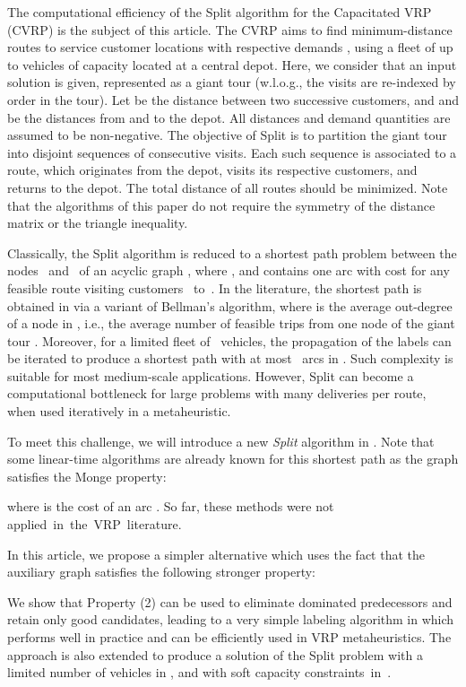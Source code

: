 \documentclass[11pt]{article}
\newcommand{\blue}[1]{{#1}}
\begin{document}
\blue{The computational efficiency of the Split algorithm for the Capacitated VRP (CVRP) is the subject of  this article. The CVRP aims to find minimum-distance routes to service  customer locations with respective demands , using a fleet of up to  vehicles of capacity  located at a central depot. Here, we consider that an input solution is given, represented as a giant tour  (w.l.o.g., the visits are re-indexed by order in the tour). Let  be the distance between two successive customers, and  and  be the distances from and to the depot. All distances and demand quantities are assumed to be non-negative. The objective of Split is to partition the giant tour into  disjoint sequences of consecutive visits. Each such sequence is associated to a route, which originates from the depot, visits its respective customers, and returns to the depot. The total distance of all routes should be minimized. Note that the algorithms of this paper do not require the symmetry of the distance matrix or the triangle inequality.}

\blue{Classically, the Split algorithm is reduced to a shortest path problem between the nodes ~and~ of an acyclic graph , where , and  contains one arc  with cost 
for any feasible route visiting customers ~to~.
In the literature, the shortest path is obtained in  via a variant of Bellman's algorithm, where  is the average out-degree of a node in , i.e., the average number of feasible trips from one node of the giant tour \citep{Beasley1983,Prins2004}.}
Moreover, for a limited fleet of~ vehicles, the propagation of the labels can be iterated to produce a shortest path with at most~ arcs in . Such complexity is suitable for most medium-scale applications. However, Split can become a computational bottleneck for large problems \blue{with many deliveries per route}, when used iteratively in a metaheuristic.

To meet this challenge, we will introduce a new \emph{Split} algorithm in .
Note that some linear-time algorithms are already known for this shortest path \citep[see][and the references therein]{Burkard1996,Bein2005} as the graph  satisfies the Monge property:

where  is the cost of an arc .
So far, these methods were not applied~in~the~VRP~literature.

In this article, we propose a simpler alternative which uses the fact that the auxiliary graph  satisfies the following stronger property:

We show that Property (2) can be used to eliminate dominated predecessors and retain only good candidates, leading to a very simple labeling algorithm in  which performs well in practice and can be efficiently used in VRP metaheuristics.
The approach is also extended to produce a solution of the Split problem with a limited number of vehicles in , and with soft capacity constraints~in~. 
\end{document}
